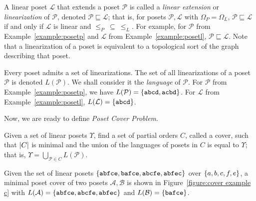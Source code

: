\documentclass[12pt]{llncs}
\DeclarePairedDelimiter{\set}{\{}{\}}
\DeclarePairedDelimiter{\abs}{\lvert}{\rvert}
\let\oldleq\leq
\renewcommand{\leq}[1][]{\oldleq_{#1}}
\newcommand{\poset}[1]{\mathcal{#1}}
\newcommand{\uni}[1][]{\Omega_{#1}}
\newcommand{\lang}[1]{L(#1)}
\newcommand{\lin}[1]{\texttt{#1}}
\newcommand{\lext}{\sqsubseteq}
\begin{document}
A linear poset $\poset{L}$ that extends a poset $\poset{P}$ is called a \emph{linear extension} or \emph{linearization} of $\poset{P}$, denoted $\poset{P} \lext \poset{L}$; that is, for posets $\poset{P},\poset{L}$ with $\uni[P] \!=\! \uni[L]$, $\poset{P} \lext \poset{L}$ if and only if $\poset{L}$ is linear and $\leq[P] \>\subseteq\> \leq[L]$. For example, for $\poset{P}$ from Example~\ref{example:posetp} and $\poset{L}$ from Example~\ref{example:posetl}, $\poset{P} \lext \poset{L}$. Note that a linearization of a poset is equivalent to a topological sort of the graph describing that poset.

Every poset admits a set of linearizations. The set of all linearizations of a poset $\poset{P}$ is denoted $\lang{\poset{P}}$. We shall consider it the \emph{language} of $\poset{P}$. For $\poset{P}$ from Example~\ref{example:posetp}, we have $\lang{\poset{P}} = \set{\lin{abcd},\lin{acbd}}$. For $\poset{L}$ from Example~\ref{example:posetl}, $\lang{\poset{L}} = \set{\lin{abcd}}$.

Now, we are ready to define \emph{Poset Cover Problem}.

\begin{definition}
    Given a set of linear posets $\Upsilon$, find a set of partial orders $C$, called a cover, such that $\abs{C}$ is minimal and the union of the languages of posets in $C$ is equal to $\Upsilon$; that is, $\Upsilon = \bigcup_{\poset{P} \in C} \lang{\poset{P}}$.
    \label{definition:pcp}
\end{definition}

\begin{example}
    Given the set of linear posets $\set{\lin{abfce},\lin{bafce},\lin{abcfe},\lin{abfec}}$ over $\set{a,b,c,f,e}$, a minimal poset cover of two posets $\poset{A},\poset{B}$ is shown in Figure~\ref{figure:cover example c} with ${\lang{\poset{A}} = \set{\lin{abfce},\lin{abcfe},\lin{abfec}}}$ and ${\lang{\poset{B}} = \set{\lin{bafce}}}$.
    \label{example:cover example}
\end{example}
\end{document}
